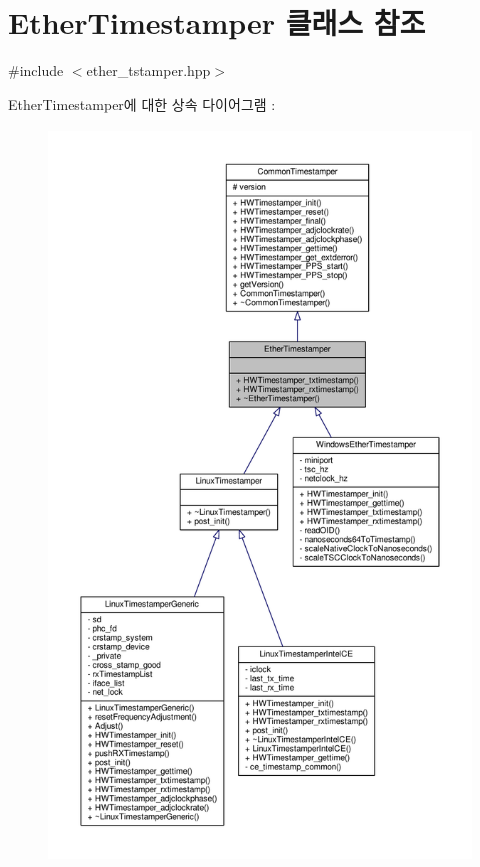 \hypertarget{class_ether_timestamper}{}\section{Ether\+Timestamper 클래스 참조}
\label{class_ether_timestamper}


{\ttfamily \#include $<$ether\+\_\+tstamper.\+hpp$>$}



Ether\+Timestamper에 대한 상속 다이어그램 \+: 
\nopagebreak
\begin{figure}[H]
\begin{center}
\leavevmode
\includegraphics[height=550pt]{class_ether_timestamper__inherit__graph}
\end{center}
\end{figure}


